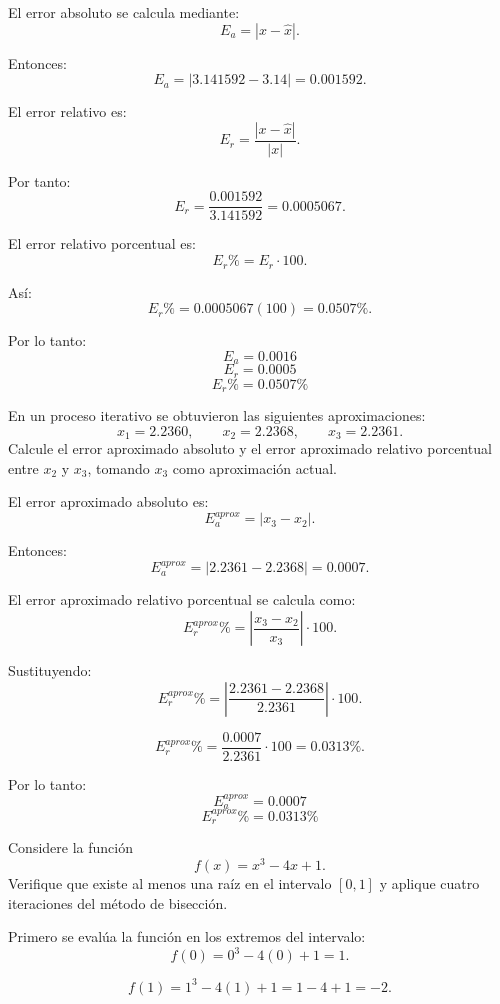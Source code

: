 \documentclass[11pt,respuestas,a4]{aleph-examen}
\begin{document}
\begin{preguntas}
\begin{respuesta}
El error absoluto se calcula mediante:
\[
E_a=|x-\hat{x}|.
\]

Entonces:
\[
E_a=|3.141592-3.14|=0.001592.
\]

El error relativo es:
\[
E_r=\frac{|x-\hat{x}|}{|x|}.
\]

Por tanto:
\[
E_r=\frac{0.001592}{3.141592}=0.0005067.
\]

El error relativo porcentual es:
\[
E_r\%=E_r\cdot 100.
\]

Así:
\[
E_r\%=0.0005067(100)=0.0507\%.
\]

Por lo tanto:
\[
\boxed{E_a=0.0016}
\]
\[
\boxed{E_r=0.0005}
\]
\[
\boxed{E_r\%=0.0507\%}
\]
\end{respuesta}


\item
En un proceso iterativo se obtuvieron las siguientes aproximaciones: 
\[
x_1=2.2360,\qquad x_2=2.2368,\qquad x_3=2.2361.
\]
Calcule el error aproximado absoluto y el error aproximado relativo porcentual entre $x_2$ y $x_3$, tomando $x_3$ como aproximación actual.

\begin{respuesta}
El error aproximado absoluto es:
\[
E_a^{aprox}=|x_3-x_2|.
\]

Entonces:
\[
E_a^{aprox}=|2.2361-2.2368|=0.0007.
\]

El error aproximado relativo porcentual se calcula como:
\[
E_r^{aprox}\%=\left|\frac{x_3-x_2}{x_3}\right|\cdot 100.
\]

Sustituyendo:
\[
E_r^{aprox}\%=\left|\frac{2.2361-2.2368}{2.2361}\right|\cdot 100.
\]

\[
E_r^{aprox}\%=\frac{0.0007}{2.2361}\cdot 100=0.0313\%.
\]

Por lo tanto:
\[
\boxed{E_a^{aprox}=0.0007}
\]
\[
\boxed{E_r^{aprox}\%=0.0313\%}
\]
\end{respuesta}



\item 
Considere la función 
\[
f(x)=x^3-4x+1.
\]
Verifique que existe al menos una raíz en el intervalo $[0,1]$ y aplique cuatro iteraciones del método de bisección.

\begin{respuesta}
Primero se evalúa la función en los extremos del intervalo:
\[
f(0)=0^3-4(0)+1=1.
\]

\[
f(1)=1^3-4(1)+1=1-4+1=-2.
\]


\end{respuesta}
\end{preguntas}
\end{document}
